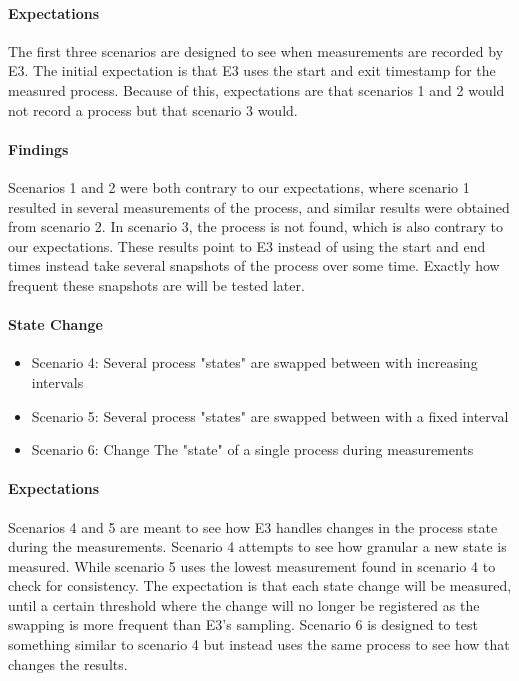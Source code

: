 \paragraph {Expectations}
The first three scenarios are designed to see when measurements are recorded by E3. The initial expectation is that E3 uses the start and exit timestamp for the measured process. Because of this, expectations are that scenarios 1 and 2 would not record a process but that scenario 3 would.

\paragraph{Findings}
Scenarios 1 and 2 were both contrary to our expectations, where scenario 1 resulted in several measurements of the process, and similar results were obtained from scenario 2. In scenario 3, the process is not found, which is also contrary to our expectations. These results point to E3 instead of using the start and end times instead take several snapshots of the process over some time. Exactly how frequent these snapshots are will be tested later. 

\paragraph{State Change}

\begin{itemize}
    \item Scenario 4: Several process "states" are swapped between with increasing intervals
    \item Scenario 5: Several process "states" are swapped between with a fixed interval
    \item Scenario 6: Change The "state" of a single process during measurements
\end{itemize}

\paragraph{Expectations}
Scenarios 4 and 5 are meant to see how E3 handles changes in the process state during the measurements. Scenario 4 attempts to see how granular a new state is measured. While scenario 5 uses the lowest measurement found in scenario 4 to check for consistency. The expectation is that each state change will be measured, until a certain threshold where the change will no longer be registered as the swapping is more frequent than E3's sampling. Scenario 6 is designed to test something similar to scenario 4 but instead uses the same process to see how that changes the results.
